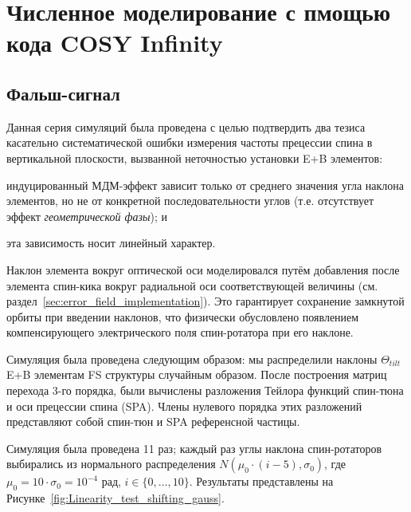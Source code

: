 \chapter{Численное моделирование с пмощью кода COSY Infinity} \label{chpt:simulation}

\section{Фальш-сигнал} \label{sec:simulation-fake_signal}
Данная серия симуляций была проведена с целью подтвердить два тезиса
касательно систематической ошибки измерения частоты прецессии спина в
вертикальной плоскости, вызванной неточностью установки E+B элементов:
\begin{enumerate*}[1)]
	\item индуцированный МДМ-эффект зависит только от среднего значения
	угла наклона элементов, но не от  конкретной последовательности
	углов (т.е. отсутствует эффект \emph{геометрической фазы}); и
	\item эта зависимость носит линейный характер.
\end{enumerate*}

Наклон элемента вокруг оптической оси моделировался путём добавления
после элемента спин-кика вокруг радиальной оси соответствующей
величины (см. раздел~\ref{sec:error_field_implementation}). Это
гарантирует сохранение замкнутой орбиты при введении наклонов, что
физически обусловлено появлением компенсирующего электрического поля 
спин-ротатора при его наклоне.

Симуляция была проведена следующим образом: мы распределили наклоны
$\Theta_{tilt}$ E+B элементам FS структуры случайным образом. После
построения матриц перехода 3-го порядка, были вычислены разложения
Тейлора функций спин-тюна и оси прецессии спина (SPA). Члены нулевого
порядка этих разложений представляют собой спин-тюн и SPA референсной частицы.

Симуляция была проведена 11 раз; каждый раз углы наклона
спин-ротаторов выбирались из нормального распределения
$N(\mu_0\cdot(i-5), \sigma_0)$, где $\mu_0 = 10\cdot \sigma_0 =
10^{-4}$ рад, $i\in\lbrace0,\dots, 10\rbrace$. Результаты представлены
на Рисунке~\ref{fig:Linearity_test_shifting_gauss}.

